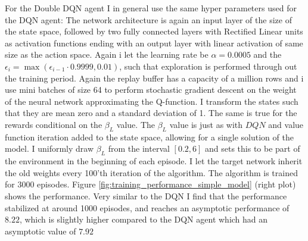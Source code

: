 For the Double DQN agent I in general use the same hyper parameters used for the DQN agent: The network architecture is again an input layer of the size of the state space, followed by two fully connected layers with Rectified Linear units as activation functions ending with an output layer with linear activation of same size as the action space. Again i let the learning rate be $\alpha = 0.0005$ and the $\epsilon_i = \max (\epsilon_{i-1} \cdot 0.9999, 0.01)$, such that exploration is performed through out the training period. Again the replay buffer has a capacity of a million rows and i use mini batches of size 64 to perform stochastic gradient descent on the weight of the neural network approximating the Q-function. I transform the states such that they are mean zero and a standard deviation of 1. The same is true for the rewards conditional on the $\beta_L$ value. The $\beta_L$ value is just as with $DQN$ and value function iteration added to the state space, allowing for a single solution of the model. I uniformly draw $\beta_L$ from the interval $[0.2, 6]$ and sets this to be part of the environment in the beginning of each episode. I let the target network inherit the old weights every 100'th iteration of the algorithm. The algorithm is trained for 3000 episodes. Figure \ref{fig:training_performance_simple_model} (right plot) shows the performance. Very similar to the DQN I find that the performance stabilized at around 1000 episodes, and reaches an asymptotic performance of $8.22$, which is slightly higher compared to the DQN agent which had an asymptotic value of $7.92$ 

